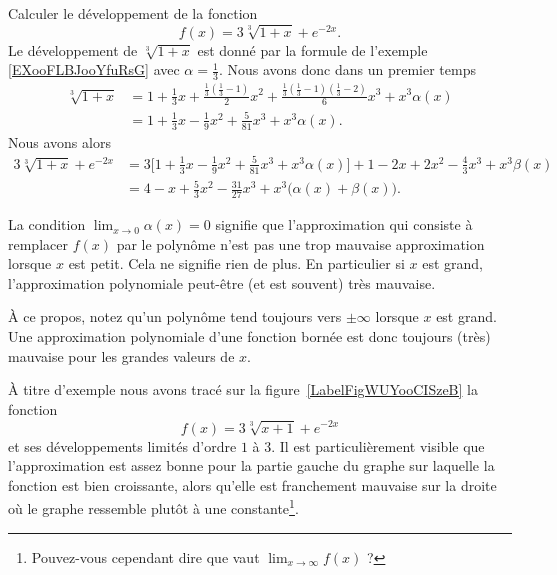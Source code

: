 \begin{example} \label{ExKPBooJmdFvY}
    Calculer le développement de la fonction
    \begin{equation}
        f(x)=3\sqrt[3]{1+x}+ e^{-2x}.
    \end{equation}
    Le développement de \( \sqrt[3]{1+x}\) est donné par la formule de l'exemple \ref{EXooFLBJooYfuRsG} avec \( \alpha=\frac{1}{ 3 }\). Nous avons donc dans un premier temps
    \begin{subequations}
        \begin{align}
            \sqrt[3]{1+x}&=1+\frac{ 1 }{ 3 }x+\frac{ \frac{1}{ 3 }\left( \frac{1}{ 3 }-1 \right) }{ 2 }x^2+\frac{ \frac{1}{ 3 }\left( \frac{1}{ 3 }-1 \right)\left( \frac{1}{ 3 }-2 \right) }{ 6 }x^3+x^3\alpha(x)\\
            &=1+\frac{1}{ 3 }x-\frac{1}{ 9 }x^2+\frac{ 5 }{ 81 }x^3+x^3\alpha(x).
        \end{align}
    \end{subequations}
    Nous avons alors
    \begin{subequations}
        \begin{align}
            3\sqrt[3]{1+x}+ e^{-2x}&=3\Big[  1+\frac{1}{ 3 }x-\frac{1}{ 9 }x^2+\frac{ 5 }{ 81 }x^3+x^3\alpha(x)\Big]+1-2x+2x^2-\frac{ 4 }{ 3 }x^3+x^3\beta(x)\\
            &=4-x+\frac{ 5 }{ 3 }x^2-\frac{ 31 }{ 27 }x^3+x^3\big( \alpha(x)+\beta(x) \big).
        \end{align}
    \end{subequations}

\end{example}

La condition \( \lim_{x\to 0} \alpha(x)=0\) signifie que l'approximation qui consiste à remplacer \( f(x) \) par le polynôme n'est pas une trop mauvaise approximation lorsque \( x\) est petit. Cela ne signifie rien de plus. En particulier si \( x\) est grand, l'approximation polynomiale peut-être (et est souvent) très mauvaise.

À ce propos, notez qu'un polynôme tend toujours vers \( \pm\infty\) lorsque \( x\) est grand. Une approximation polynomiale d'une fonction bornée est donc toujours (très) mauvaise pour les grandes valeurs de \( x\).

À titre d'exemple nous avons tracé sur la figure~\ref{LabelFigWUYooCISzeB} la fonction
\begin{equation}
    f(x)=3\sqrt[3]{x+1}+ e^{-2x}
\end{equation}
et ses développements limités d'ordre \( 1\) à \( 3\). Il est particulièrement visible que l'approximation est assez bonne pour la partie gauche du graphe sur laquelle la fonction est bien croissante, alors qu'elle est franchement mauvaise sur la droite où le graphe ressemble plutôt à une constante\footnote{Pouvez-vous cependant dire que vaut \( \lim_{x\to \infty} f(x)\) ?}.


